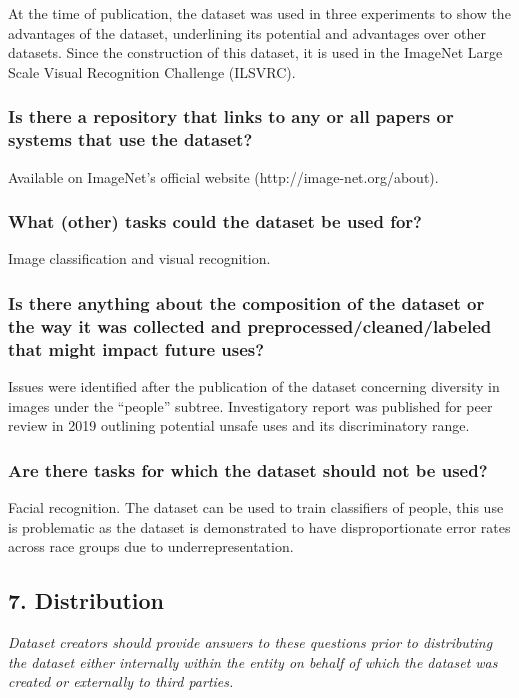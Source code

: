 \documentclass[a4paper,12pt]{article}
\begin{document}
At the time of publication, the dataset was used in three experiments to show the advantages of the
dataset, underlining its potential and advantages over other datasets. Since the construction of this
dataset, it is used in the ImageNet Large Scale Visual Recognition Challenge (ILSVRC).

\subsubsection*{Is there a repository that links to any or all papers or systems that use the dataset?}

Available on ImageNet’s official website (http://image-net.org/about).

\subsubsection*{What (other) tasks could the dataset be used for?}

Image classification and visual recognition.

\subsubsection*{Is there anything about the composition of the dataset or the way it was collected and
  preprocessed/cleaned/labeled that might impact future uses?}

Issues were identified after the publication of the dataset concerning diversity in images under the
``people'' subtree. Investigatory report was published for peer review in 2019 outlining potential
unsafe uses and its discriminatory range.

\subsubsection*{Are there tasks for which the dataset should not be used?}

Facial recognition. The dataset can be used to train classifiers of people, this use is problematic as
the dataset is demonstrated to have disproportionate error rates across race groups due to
underrepresentation.

\subsection*{7. Distribution}

\textsl{Dataset creators should provide answers to these questions
prior to distributing the dataset either internally within the entity on behalf of
which the dataset was created or externally to third parties.}
\end{document}
